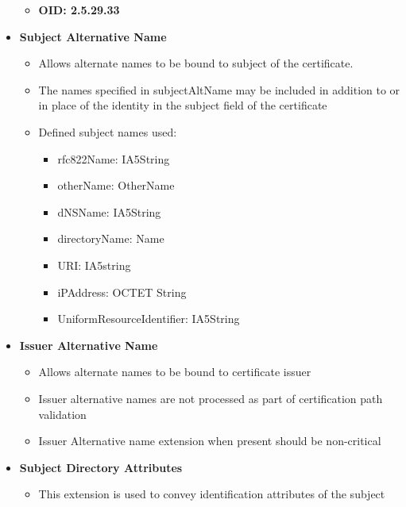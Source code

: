 \documentclass[12pt]{report}
\begin{document}
\begin{itemize}
\begin{itemize}
                    \item \textbf{OID: 2.5.29.33}
                \end{itemize}
            \item \textbf{Subject Alternative Name}
                \begin{itemize}
                    \item Allows alternate names to be bound to subject of the certificate. 
                    \item The names specified in subjectAltName may be included in addition to
                        or in place of the identity in the subject field of the certificate
                    \item Defined subject names used:
                        \begin{itemize}
                            \item rfc822Name:       IA5String
                            \item otherName:        OtherName
                            \item dNSName:          IA5String
                            \item directoryName:    Name
                            \item URI:              IA5string
                            \item iPAddress:        OCTET String
                            \item UniformResourceIdentifier: IA5String
                        \end{itemize}
                \end{itemize}
            \item \textbf{Issuer Alternative Name}
                \begin{itemize}
                    \item Allows alternate names to be bound to certificate issuer
                    \item Issuer alternative names are not processed as part of certification path validation
                    \item Issuer Alternative name extension when present should be non-critical
                \end{itemize}
            \item \textbf{Subject Directory Attributes}
                \begin{itemize}
                    \item This extension is used to convey identification attributes of the subject

\end{itemize}
\end{itemize}
\end{document}
